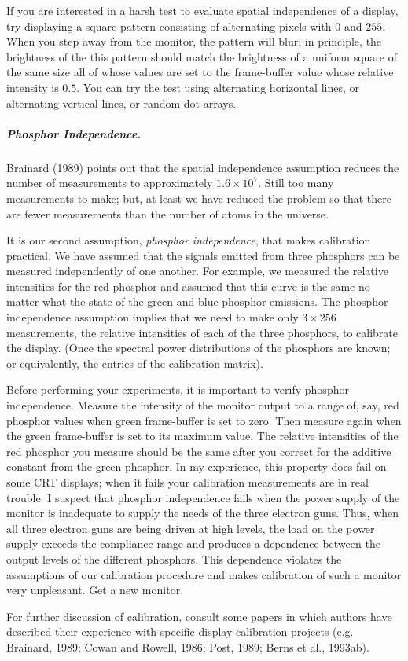 If you are interested in a harsh test to evaluate spatial independence
of a display, try displaying a square pattern consisting of
alternating pixels with $0$ and $255$.  When you step away from the
monitor, the pattern will blur; in principle, the brightness of the
this pattern should match the brightness of a uniform square of the
same size all of whose values are set to the frame-buffer value whose
relative intensity is $0.5$.  You can try the test using alternating
horizontal lines, or alternating vertical lines, or random dot arrays.

\subparagraph{Phosphor Independence.  }
Brainard (1989) points out that the spatial independence assumption
reduces the number of measurements to approximately $1.6 \times
10^{7}$.  Still too many measurements to make; but, at least we have
reduced the problem so that there are fewer measurements than the
number of atoms in the universe.

It is our second assumption, {\em phosphor independence}, that
makes calibration practical.  We have assumed that the signals emitted
from three phosphors can be measured independently of one another.
For example, we measured the relative intensities for the red phosphor
and assumed that this curve is the same no matter what the state of
the green and blue phosphor emissions.  The phosphor independence
assumption implies that we need to make only $3 \times 256$
measurements, the relative intensities of each of the three phosphors,
to calibrate the display.  (Once the spectral power distributions of
the phosphors are known; or equivalently, the entries of the
calibration matrix).

Before performing your experiments, it is important to verify phosphor
independence.  Measure the intensity of the monitor output to a range
of, say, red phosphor values when green frame-buffer is set to zero.
Then measure again when the green frame-buffer is set to its maximum
value.  The relative intensities of the red phosphor you measure
should be the same after you correct for the additive constant from
the green phosphor.  In my experience, this property does fail on some
CRT displays; when it fails your calibration measurements are in real
trouble.  I suspect that phosphor independence fails when the power
supply of the monitor is inadequate to supply the needs of the three
electron guns.  Thus, when all three electron guns are being driven at
high levels, the load on the power supply exceeds the compliance range
and produces a dependence between the output levels of the different
phosphors.  This dependence violates the assumptions of our
calibration procedure and makes calibration of such a monitor very
unpleasant.  Get a new monitor.

For further discussion of calibration, consult some papers in which
authors have described their experience with specific display
calibration projects (e.g. Brainard, 1989; Cowan and Rowell, 1986;
Post, 1989; Berns et al., 1993ab).


